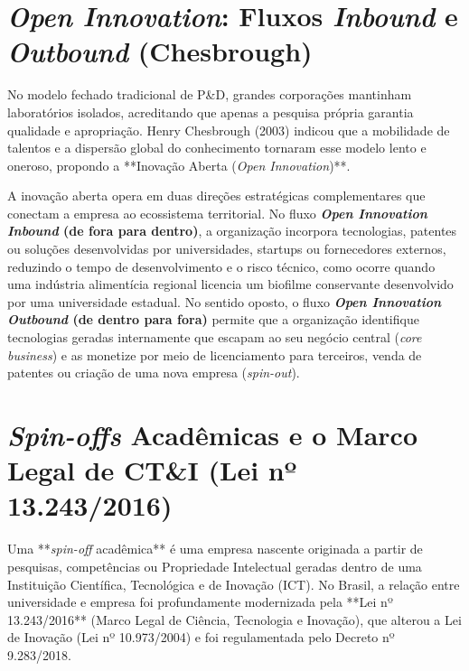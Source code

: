 \section{\textit{Open Innovation}: Fluxos \textit{Inbound} e \textit{Outbound} (Chesbrough)}

No modelo fechado tradicional de P\&D, grandes corporações mantinham laboratórios isolados, acreditando que apenas a pesquisa própria garantia qualidade e apropriação. Henry Chesbrough (2003) indicou que a mobilidade de talentos e a dispersão global do conhecimento tornaram esse modelo lento e oneroso, propondo a **Inovação Aberta (\textit{Open Innovation})**.

A inovação aberta opera em duas direções estratégicas complementares que conectam a empresa ao ecossistema territorial. No fluxo \textbf{\textit{Open Innovation Inbound} (de fora para dentro)}, a organização incorpora tecnologias, patentes ou soluções desenvolvidas por universidades, startups ou fornecedores externos, reduzindo o tempo de desenvolvimento e o risco técnico, como ocorre quando uma indústria alimentícia regional licencia um biofilme conservante desenvolvido por uma universidade estadual. No sentido oposto, o fluxo \textbf{\textit{Open Innovation Outbound} (de dentro para fora)} permite que a organização identifique tecnologias geradas internamente que escapam ao seu negócio central (\textit{core business}) e as monetize por meio de licenciamento para terceiros, venda de patentes ou criação de uma nova empresa (\textit{spin-out}).

\section{\textit{Spin-offs} Acadêmicas e o Marco Legal de CT\&I (Lei nº 13.243/2016)}

Uma **\textit{spin-off} acadêmica** é uma empresa nascente originada a partir de pesquisas, competências ou Propriedade Intelectual geradas dentro de uma Instituição Científica, Tecnológica e de Inovação (ICT). No Brasil, a relação entre universidade e empresa foi profundamente modernizada pela **Lei nº 13.243/2016** (Marco Legal de Ciência, Tecnologia e Inovação), que alterou a Lei de Inovação (Lei nº 10.973/2004) e foi regulamentada pelo Decreto nº 9.283/2018.

